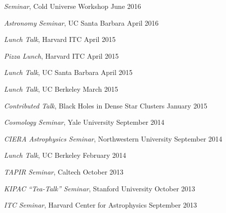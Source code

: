 \begin{talkenum}

\item \textit{Seminar}, Cold Universe Workshop \hspace*{\fill} June 2016

\item \textit{Astronomy Seminar}, UC Santa Barbara \hspace*{\fill} April 2016

\item \textit{Lunch Talk}, Harvard ITC \hspace*{\fill} April 2015

\item \textit{Pizza Lunch}, Harvard ITC \hspace*{\fill} April 2015

\item \textit{Lunch Talk}, UC Santa Barbara \hspace*{\fill} April 2015

\item \textit{Lunch Talk}, UC Berkeley \hspace*{\fill} March 2015

\item \textit{Contributed Talk}, Black Holes in Dense Star Clusters \hspace*{\fill} January 2015

\item \textit{Cosmology Seminar}, Yale University \hspace*{\fill} September 2014

\item \textit{CIERA Astrophysics Seminar}, Northwestern University \hspace*{\fill} September 2014

\item \textit{Lunch Talk}, UC Berkeley \hspace*{\fill} February 2014

\item \textit{TAPIR Seminar}, Caltech \hspace*{\fill} October 2013

\item \textit{KIPAC “Tea-Talk” Seminar}, Stanford University \hspace*{\fill} October 2013

\item \textit{ITC Seminar}, Harvard Center for Astrophysics \hspace*{\fill} September 2013


\end{talkenum}
